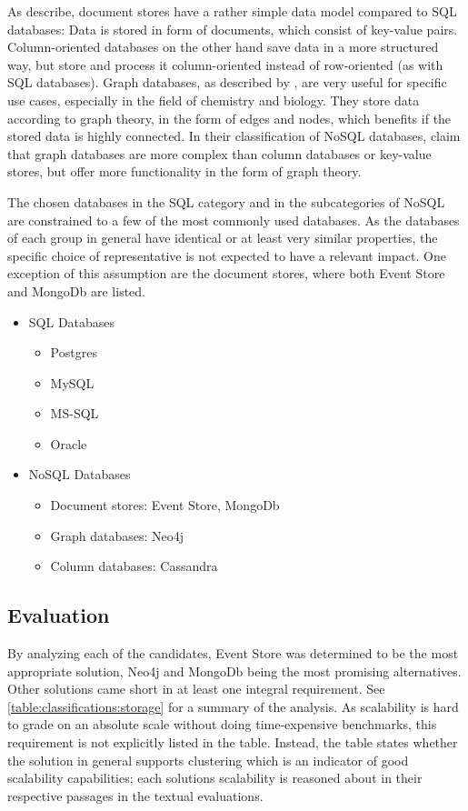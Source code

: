 As \citet{strauch2011nosql} describe, document stores have a rather simple data model compared to \ac{SQL} databases:
Data is stored in form of documents, which consist of key-value pairs.
Column-oriented databases on the other hand save data in a more structured way, but store and process it column-oriented instead of row-oriented (as with \ac{SQL} databases).
Graph databases, as described by \citet{miller2013graph}, are very useful for specific use cases, especially in the field of chemistry and biology.
They store data according to graph theory, in the form of edges and nodes, which benefits if the stored data is highly connected.
In their classification of \ac{NoSQL} databases, \citet{popescu2010nosql} claim that graph databases are more complex than column databases or key-value stores, but offer more functionality in the form of graph theory.

The chosen databases in the \ac{SQL} category and in the subcategories of \ac{NoSQL} are constrained to a few of the most commonly used databases.
As the databases of each group in general have identical or at least very similar properties, the specific choice of representative is not expected to have a relevant impact.
One exception of this assumption are the document stores, where both Event Store and MongoDb are listed.

\begin{itemize}[noitemsep]
\item \ac{SQL} Databases
\begin{itemize}[noitemsep]
\item Postgres
\item MySQL
\item MS-SQL
\item Oracle
\end{itemize}
\item NoSQL Databases
\begin{itemize}[noitemsep]
\item Document stores: Event Store, MongoDb
\item Graph databases: Neo4j
\item Column databases: Cassandra
\end{itemize}
\end{itemize}

\subsection{Evaluation}

By analyzing each of the candidates, Event Store was determined to be the most appropriate solution, Neo4j and MongoDb being the most promising alternatives.
Other solutions came short in at least one integral requirement.
See \cref{table:classifications:storage} for a summary of the analysis.
As scalability is hard to grade on an absolute scale without doing time-expensive benchmarks, this requirement is not explicitly listed in the table.
Instead, the table states whether the solution in general supports clustering which is an indicator of good scalability capabilities; each solutions scalability is reasoned about in their respective passages in the textual evaluations.

